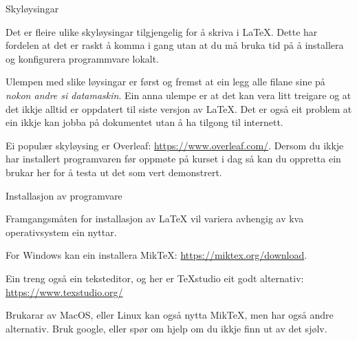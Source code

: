 \begin{frame}{Skyløysingar}

  	
	
  Det er fleire ulike skyløysingar tilgjengelig for å skriva i \LaTeX. Dette har fordelen at det er raskt å komma i gang utan at du må bruka tid på å installera og konfigurera programmvare lokalt.

  Ulempen med slike løysingar er først og fremst at ein legg alle filane sine på \textit{nokon andre si datamaskin}. Ein anna ulempe er at det kan vera litt treigare og at det ikkje alltid er oppdatert til siste versjon av \LaTeX. Det er også eit problem at ein ikkje kan jobba på dokumentet utan å ha tilgong til internett.
	
	Ei populær skyløysing er Overleaf: \url{https://www.overleaf.com/}. Dersom du ikkje har installert programvaren før oppmøte på kurset i dag så kan du oppretta ein brukar her for å testa ut det som vert demonstrert.
	
\end{frame}


\begin{frame}{Installasjon av programvare}

	
  
	Framgangsmåten for installasjon av \LaTeX{} vil variera avhengig av kva operativsystem ein nyttar.
	
	For Windows kan ein installera MikTeX: \url{https://miktex.org/download}.
	
	Ein treng også ein teksteditor, og her er TeXstudio eit godt alternativ: \url{https://www.texstudio.org/}
	
	Brukarar av MacOS, eller Linux kan også nytta MikTeX, men har også andre alternativ. Bruk google, eller spør om hjelp om du ikkje finn ut av det sjølv.
\end{frame}



